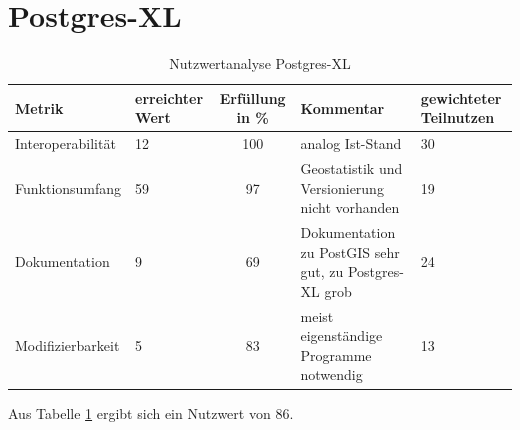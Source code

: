 \section{Postgres-XL}
\begin{table}[htp]
\centering
\small
\begin{tabular}{l|p{1.8cm}|c|p{3.1cm}|p{1.8cm}}
\textbf{Metrik} & \textbf{erreichter Wert} & \textbf{Erfüllung in \%} & \textbf{Kommentar} & \textbf{gewichteter Teilnutzen} \\ \hline
Interoperabilität & 12 & 100 & analog Ist-Stand & 30 \\ \hline
Funktionsumfang & 59 & 97 & Geostatistik und Versionierung nicht vorhanden & 19 \\ \hline
Dokumentation & 9 & 69 & Dokumentation zu PostGIS sehr gut, zu Postgres-XL grob & 24 \\ \hline
Modifizierbarkeit & 5 & 83 & meist eigenständige Programme notwendig & 13 \\
\end{tabular}
\caption{Nutzwertanalyse Postgres-XL}
\label{table:nutzwertanalyse-postgresxl}
\end{table}
Aus Tabelle \ref{table:nutzwertanalyse-postgresxl} ergibt sich ein Nutzwert von 86.



